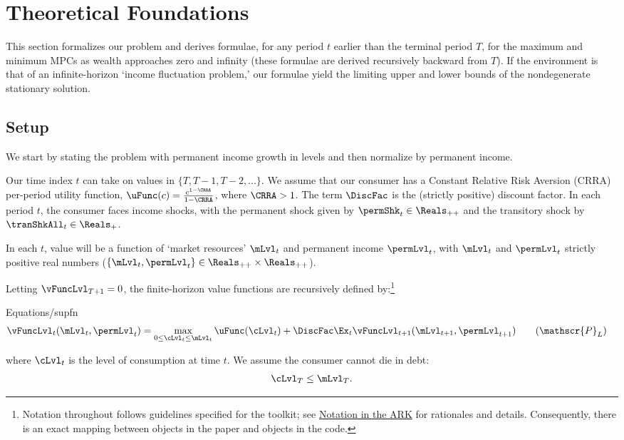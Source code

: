\documentclass[BufferStockTheory]{subfiles}
\begin{document}

\hypertarget{The-Problem}{}
\section{Theoretical Foundations}

This section formalizes our problem and derives formulae, for any period $t$ earlier than the terminal period $T$, for the maximum and minimum MPCs as wealth approaches zero and infinity (these formulae are derived recursively backward from $T$).  If the environment is that of an infinite-horizon `income fluctuation problem,' our formulae yield the limiting upper and lower bounds of the nondegenerate stationary solution.

\label{sec:Foundations}
\subsection{Setup}\label{subsec:Setup}

We start by stating the problem with permanent income growth in levels and then normalize by permanent income.

Our time index $t$ can take on values in $\{T,T-1,T-2,\dots \}$. We assume that our consumer has a Constant Relative Risk Aversion (CRRA) per-period utility function, $\uFunc(c)=\frac{c^{1-\CRRA}}{1-\CRRA}$, where $\CRRA>1$. The term $\DiscFac$ is the (strictly positive) discount factor. In each period $t$, the consumer faces income shocks, with the permanent shock given by $\permShk_{t} \in \Reals_{++}$ and the transitory shock by $\tranShkAll_{t} \in \Reals_{+}$. 

In each $t$, value will be a function of `market resources' $\mLvl_{t}$ and permanent income $\permLvl_{t}$, with $\mLvl_{t}$ and $\permLvl_{t}$ strictly positive real numbers ($\{\mLvl_{t} , \permLvl_{t}\} \in \Reals_{++} \times \Reals_{++}$).

Letting $\vFuncLvl_{T+1} = 0$, the finite-horizon value functions are recursively defined by:\footnote{Notation throughout follows guidelines specified for the {\ARKurl} toolkit; see \href{https://github.com/econ-ark/HARK/blob/master/Documentation/NARK/NARK.pdf}{Notation in the ARK} for rationales and details.  Consequently, there is an exact mapping between objects in the paper and objects in the code.}
%
\begin{verbatimwrite}{Equations/supfn}
  \begin{align}\label{eq:levelRecProblem}
    \vFuncLvl_{t}(\mLvl_{t}, \permLvl_{t}) & = \max_{0 \leq\cLvl_{t} \leq \mLvl_{t}} \uFunc(\cLvl_{t}) + \DiscFac \Ex_{t}\vFuncLvl_{t+1}(\mLvl_{t+1}, \permLvl_{t+1}) \tag{$\mathscr{P}_{L}$}
  \end{align}
\end{verbatimwrite}

where $\cLvl_{t}$ is the level of consumption at time $t$.
We assume the consumer cannot die in debt:
%
\begin{equation}\label{eq:NoDebtAtDeath}
\cLvl_{T} \leq  \mLvl_{T} .
\end{equation}
\end{document}
